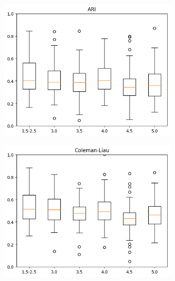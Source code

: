 \documentclass[12pt,journal,compsoc]{IEEEtran}
\begin{document}
\begin{figure}[H]
\centering
\begin{subfigure}{0.27\textwidth}
\includegraphics[scale=0.41]{../unigrams/scripts/boxplots/ARI.png}
\end{subfigure} \hspace{0.05\textwidth}
\begin{subfigure}{0.27\textwidth}
\includegraphics[scale=0.41]{../unigrams/scripts/boxplots/Coleman-Liau.png}
\end{subfigure} \hspace{0.05\textwidth}
\begin{subfigure}{0.27\textwidth}

\end{subfigure}
\end{figure}
\end{document}
